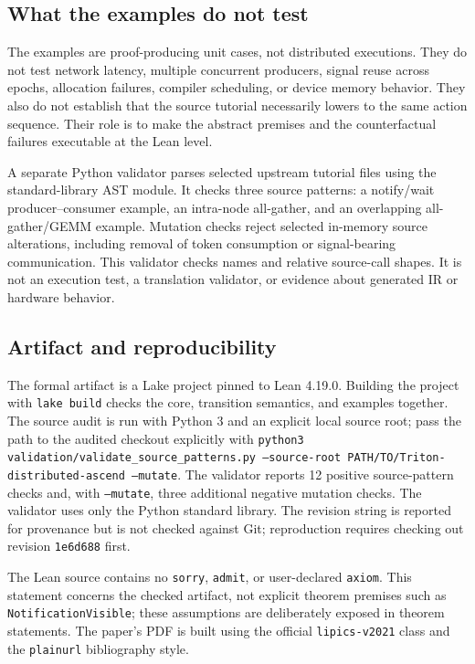 \documentclass[a4paper,USenglish]{lipics-v2021}
\begin{document}
\subsection{What the examples do not test}
The examples are proof-producing unit cases, not distributed executions. They
do not test network latency, multiple concurrent producers, signal reuse across
epochs, allocation failures, compiler scheduling, or device memory behavior.
They also do not establish that the source tutorial necessarily lowers to the
same action sequence. Their role is to make the abstract premises and the
counterfactual failures executable at the Lean level.

A separate Python validator parses selected upstream tutorial files using the standard-library AST module. It checks three source patterns: a notify/wait producer--consumer example, an intra-node all-gather, and an overlapping all-gather/GEMM example. Mutation checks reject selected in-memory source alterations, including removal of token consumption or signal-bearing communication. This validator checks names and relative source-call shapes. It is not an execution test, a translation validator, or evidence about generated IR or hardware behavior.

\subsection{Artifact and reproducibility}
The formal artifact is a Lake project pinned to Lean 4.19.0. Building the
project with \texttt{lake build} checks the core, transition semantics, and
examples together. The source audit is run with Python 3 and an explicit local
source root; pass the path to the audited checkout explicitly with
\texttt{python3 validation/validate\_source\_patterns.py --source-root
PATH/TO/Triton-distributed-ascend --mutate}. The validator reports 12 positive
source-pattern checks and, with \texttt{--mutate}, three additional negative
mutation checks. The validator uses only the Python standard library. The
revision string is reported for provenance but is not checked against Git;
reproduction requires checking out revision \texttt{1e6d688} first.

The Lean source contains no \texttt{sorry}, \texttt{admit}, or user-declared
\texttt{axiom}. This statement concerns the checked artifact, not explicit
theorem premises such as \texttt{NotificationVisible}; these assumptions are
deliberately exposed in theorem statements. The paper's PDF is built using the official
\texttt{lipics-v2021} class and the \texttt{plainurl} bibliography style.
\end{document}
